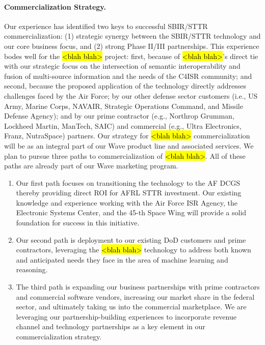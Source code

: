 \documentclass{sbir}
\begin{document}
\paragraph{Commercialization Strategy.} Our experience has identified two keys to successful SBIR/STTR commercialization: (1) strategic synergy between the SBIR/STTR technology and our core business focus, and (2) strong Phase II/III partnerships.
This experience bodes well for the \hl{<blah blah>} project: first, because of \hl{<blah blah>}'s direct tie with our strategic focus on the intersection of semantic interoperability and fusion of multi-source information and the needs of the C4ISR community; and second, because the proposed application of the technology directly addresses challenges faced by the Air Force; by our other defense sector customers (i.e., US Army, Marine Corps, NAVAIR, Strategic Operations Command, and Missile Defense Agency); and by our prime contractor (e.g., Northrop Grumman, Lockheed Martin, ManTech, SAIC) and commercial (e.g., Ultra Electronics, Franz, NutraSpace) partners.
Our strategy for \hl{<blah blah>} commercialization will be as an integral part of our Wave product line and associated services. We plan to pursue three paths to commercialization of \hl{<blah blah>}. All of these paths are already part of our Wave marketing program.
\begin{enumerate}
  \item Our first path focuses on transitioning the technology to the AF DCGS thereby providing direct ROI for AFRL STTR investment. Our existing knowledge and experience working with the Air Force ISR Agency, the Electronic Systems Center, and the 45-th Space Wing will provide a solid foundation for success in this initiative.
  \item Our second path is deployment to our existing DoD customers and prime contractors, leveraging the \hl{<blah blah>} technology to address both known and anticipated needs they face in the area of machine learning and reasoning.
  \item The third path is expanding our business partnerships with prime contractors and commercial software vendors, increasing our market share in the federal sector, and ultimately taking us into the commercial marketplace. We are leveraging our partnership-building experiences to incorporate revenue channel and technology partnerships as a key element in our commercialization strategy.
\end{enumerate}
\end{document}

